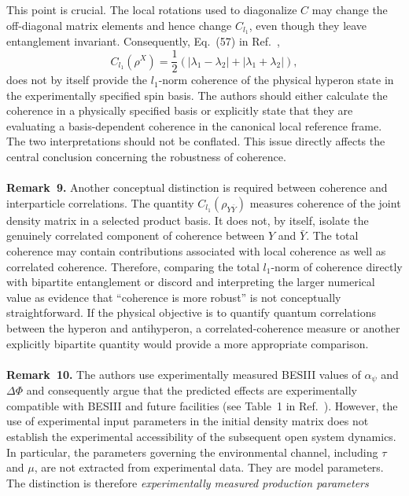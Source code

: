 \documentclass[epjc,twocolumn,nofootinbib,preprintnumbers,amsmath,amssymb]{revtex4-2}
\begin{document}
This point is crucial. The local rotations used to diagonalize $C$ may change the off-diagonal matrix elements and hence change $C_{l_1}$, even though they leave entanglement invariant.
Consequently, Eq.~(57) in Ref.~\cite{Bachain},
\begin{equation}
C_{l_1}(\rho^X)
=
\frac12
\left(
|\lambda_1-\lambda_2|
+
|\lambda_1+\lambda_2|
\right),
\end{equation}
does not by itself provide the $l_1$-norm coherence of the physical hyperon state in the experimentally specified spin basis.
The authors should either calculate the coherence in a physically specified basis or explicitly state that they are evaluating a basis-dependent coherence in the canonical local reference frame. The two interpretations should not be conflated.
This issue directly affects the central conclusion concerning the robustness of coherence.
\\
\\
\textbf{Remark~9.}
Another conceptual distinction is required between coherence and interparticle correlations.
The quantity
$
C_{l_1}(\rho_{Y\bar Y})
$
measures coherence of the joint density matrix in a selected product basis. It does not, by itself, isolate the genuinely correlated component of coherence between $Y$ and $\bar Y$.
The total coherence may contain contributions associated with local coherence as well as correlated coherence. Therefore, comparing the total $l_1$-norm of coherence directly with bipartite entanglement or discord and interpreting the larger numerical value as evidence that ``coherence is more robust'' is not conceptually straightforward.
If the physical objective is to quantify quantum correlations between the hyperon and antihyperon, a correlated-coherence measure or another explicitly bipartite quantity would provide a more appropriate comparison.
\\
\\
\textbf{Remark~10.}
The authors use experimentally measured BESIII values of $\alpha_\psi$ and $\Delta\Phi$ and consequently argue that the predicted effects are experimentally compatible with BESIII and future facilities (see Table~1 in Ref.~\cite{Bachain}).
However, the use of experimental input parameters in the initial density matrix does not establish the experimental accessibility of the subsequent open system dynamics.
In particular, the parameters governing the environmental channel, including $\tau$ and $\mu$, are not extracted from experimental data. They are model parameters.
The distinction is therefore
\textit{experimentally measured production parameters}
\end{document}
